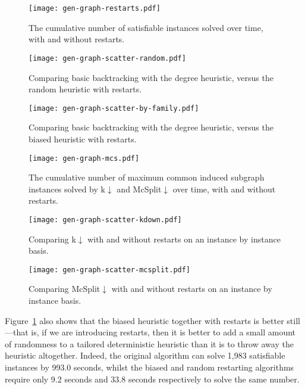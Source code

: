 \documentclass[a4paper,UKenglish]{lipics-v2018}
\newcommand{\Figureref}[1]{Figure~\ref{#1}}
\begin{document}
\begin{figure}[p]
    \centering
    \texttt{[image: gen-graph-restarts.pdf]}

    \caption{The cumulative number of satisfiable instances solved over time, with and without
    restarts.}
    \label{figure:restarts}
\end{figure}

\begin{figure}[p]
    \centering
    \texttt{[image: gen-graph-scatter-random.pdf]}
    \caption{Comparing basic backtracking with the degree heuristic, versus the random heuristic
    with restarts.}
    \label{figure:scatter-random}
\end{figure}

\begin{figure}[p]
    \centering
    \texttt{[image: gen-graph-scatter-by-family.pdf]}

    \caption{Comparing basic backtracking with the degree heuristic, versus the biased
    heuristic with restarts.}
    \label{figure:scatter-by-family}
\end{figure}

\begin{figure}[p]
    \centering
    \texttt{[image: gen-graph-mcs.pdf]}
    \caption{The cumulative number of maximum common induced subgraph instances solved by
    k${\downarrow}$ and McSplit${\downarrow}$ over time, with and without restarts.}\label{figure:mcs}
\end{figure}

\begin{figure}[p]
    \centering
    \texttt{[image: gen-graph-scatter-kdown.pdf]}
    \caption{Comparing k${\downarrow}$ with and without restarts on an instance by instance basis.}\label{figure:kdown}
\end{figure}

\begin{figure}[p]
    \centering
    \texttt{[image: gen-graph-scatter-mcsplit.pdf]}
    \caption{Comparing McSplit${\downarrow}$ with and without restarts on an instance by instance
    basis.}\label{figure:mcsplit}
\end{figure}

\Figureref{figure:restarts} also shows that the biased heuristic together with restarts is better
still---that is, if we are introducing restarts, then it is better to add a small amount of
randomness to a tailored deterministic heuristic than it is to throw away the heuristic altogether.
Indeed, the original algorithm can solve 1,983 satisfiable instances by 993.0 seconds, whilst the
biased and random restarting algorithms require only 9.2 seconds and 33.8 seconds respectively to
solve the same number.
\end{document}
